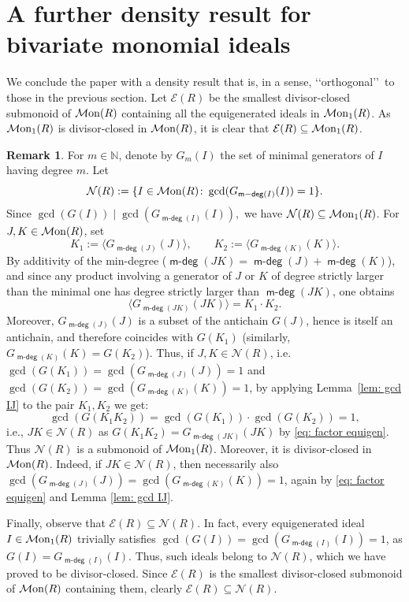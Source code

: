 \documentclass[a4paper,10pt,reqno]{amsart}
\theoremstyle{definition}
\theoremstyle{definition}
\newtheorem{remark}[theorem]{Remark}
\providecommand\Mon{{\mathcal{M}{\rm on}}}
\DeclareMathOperator{\mdeg}{\mathsf {m-deg}}
\begin{document}
\section{A further density result for bivariate monomial ideals}
We conclude the paper with a density result that is, in a sense, \lq\lq orthogonal\rq\rq\ to those in the previous section. Let $\mathcal E(R)$ be the smallest divisor-closed submonoid of $\Mon(R)$ containing all the equigenerated ideals in $\Mon_1(R)$. As $\Mon_1(R)$ is divisor-closed in $\Mon(R)$, it is clear that $\mathcal E(R)\subseteq \Mon_1(R)$.

\begin{remark}\label{rmk: mon equigen ez}
    For $m\in\mathbb N$, denote by $G_m(I)$ the set of minimal generators of $I$ having degree $m$. Let
    \[\mathcal N(R) := \{I\in\Mon(R)\colon  \gcd(G_{\mdeg(I)}(I)) = 1\}. \]
    Since $\gcd(G(I))\mid \gcd(G_{\mdeg(I)}(I)),$ we have $\mathcal N(R)\subseteq \Mon_1(R)$. For $J,K \in \Mon(R)$, set
\[
K_1 := \langle G_{\mdeg(J)}(J)\rangle, \qquad K_2 := \langle G_{\mdeg(K)}(K)\rangle.
\]
By additivity of the min-degree ($\mdeg(JK) = \mdeg(J)+\mdeg(K)$), and since any product involving a generator of $J$ or $K$ of degree strictly larger than the minimal one has degree strictly larger than $\mdeg(JK)$, one obtains
\begin{equation}\label{eq: factor equigen}
        \langle G_{\mdeg(JK)}(JK)\rangle = K_1 \cdot K_2.
    \end{equation}
Moreover, $G_{\mdeg(J)}(J)$ is a subset of the antichain $G(J)$, hence is itself an antichain, and therefore coincides with $G(K_1)$ (similarly, $G_{\mdeg(K)}(K) = G(K_2)$). Thus, if $J,K\in \mathcal N(R)$, i.e. $\gcd(G(K_1)) = \gcd(G_{\mdeg(J)}(J)) = 1$ and $\gcd(G(K_2)) = \gcd(G_{\mdeg(K)}(K)) = 1$, by applying Lemma~\ref{lem: gcd IJ} to the pair $K_1,K_2$ we get:
\begin{equation*}
\gcd(G(K_1K_2)) = \gcd(G(K_1)) \cdot \gcd(G(K_2)) = 1,
\end{equation*}
i.e., $JK\in \mathcal{N}(R)$ as $G(K_1K_2)=G_{\mdeg(JK)}(JK)$ by \eqref{eq: factor equigen}. Thus $\mathcal N(R)$ is a submonoid of $\Mon_1(R)$. Moreover, it is divisor-closed in $\Mon(R)$. Indeed, if $JK\in\mathcal N(R)$, then necessarily also $\gcd(G_{\mdeg(J)}(J)) = \gcd(G_{\mdeg(K)}(K)) = 1$, again by \eqref{eq: factor equigen} and Lemma \ref{lem: gcd IJ}.

\medskip

Finally, observe that $\mathcal E(R)\subseteq\mathcal N(R)$. In fact, every equigenerated ideal $I\in\Mon_1(R)$ trivially satisfies $\gcd(G(I))=\gcd(G_{\mdeg(I)}(I))=1$, as $G(I)=G_{\mdeg(I)}(I)$. Thus, such ideals belong to $\mathcal N(R)$, which we have proved to be divisor-closed. Since $\mathcal E(R)$ is the smallest divisor-closed submonoid of $\Mon(R)$ containing them, clearly $\mathcal E(R)\subseteq\mathcal N(R)$.
\end{remark}
\end{document}
